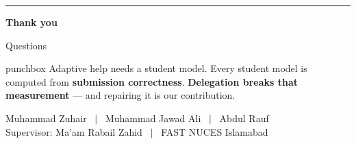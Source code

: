 \documentclass[aspectratio=169,11pt]{beamer}
\begin{document}
\begin{frame}[plain]
  \vspace{1.6cm}
  \begin{center}
    {\color{accent}\rule{2.6cm}{2.2pt}}\par\vspace{0.6em}
    {\fontsize{26}{30}\selectfont\bfseries\color{ink}Thank you}\par\vspace{0.3em}
    {\large\color{muted}Questions}\par\vspace{1.1em}
    \begin{minipage}{0.80\textwidth}
      \begin{beamercolorbox}[wd=\textwidth,sep=9pt,rounded=true]{punchbox}
        \centering Adaptive help needs a student model. Every student model is computed
        from \textbf{submission correctness}. \textbf{Delegation breaks that
        measurement} --- and repairing it is our contribution.
      \end{beamercolorbox}
    \end{minipage}\par\vspace{1.0em}
    {\scriptsize\color{muted}Muhammad Zuhair \ $\vert$ \ Muhammad Jawad Ali \ $\vert$ \ Abdul Rauf\\
     Supervisor: Ma'am Rabail Zahid \ $\vert$ \ FAST NUCES Islamabad}
  \end{center}
\end{frame}
\end{document}
